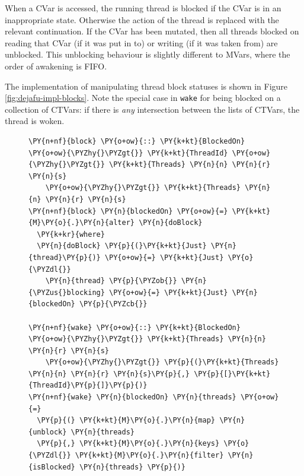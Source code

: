 When a CVar is accessed, the running thread is blocked if the CVar is
in an inappropriate state. Otherwise the action of the thread is
replaced with the relevant continuation. If the CVar has been mutated,
then all threads blocked on reading that CVar (if it was put in to) or
writing (if it was taken from) are unblocked. This unblocking
behaviour is slightly different to MVars, where the order of awakening
is FIFO.

The implementation of manipulating thread block statuses is shown in
Figure \ref{fig:dejafu-impl-blocks}. Note the special case in
\texttt{wake} for being blocked on a collection of CTVars: if there is
\textit{any} intersection between the lists of CTVars, the thread is
woken.

\begin{figure}[t]
  \centering



\begin{Verbatim}[commandchars=\\\{\}]
\PY{n+nf}{block} \PY{o+ow}{::} \PY{k+kt}{BlockedOn} \PY{o+ow}{\PYZhy{}\PYZgt{}} \PY{k+kt}{ThreadId} \PY{o+ow}{\PYZhy{}\PYZgt{}} \PY{k+kt}{Threads} \PY{n}{n} \PY{n}{r} \PY{n}{s}
    \PY{o+ow}{\PYZhy{}\PYZgt{}} \PY{k+kt}{Threads} \PY{n}{n} \PY{n}{r} \PY{n}{s}
\PY{n+nf}{block} \PY{n}{blockedOn} \PY{o+ow}{=} \PY{k+kt}{M}\PY{o}{.}\PY{n}{alter} \PY{n}{doBlock}
  \PY{k+kr}{where}
  \PY{n}{doBlock} \PY{p}{(}\PY{k+kt}{Just} \PY{n}{thread}\PY{p}{)} \PY{o+ow}{=} \PY{k+kt}{Just} \PY{o}{\PYZdl{}}
    \PY{n}{thread} \PY{p}{\PYZob{}} \PY{n}{\PYZus{}blocking} \PY{o+ow}{=} \PY{k+kt}{Just} \PY{n}{blockedOn} \PY{p}{\PYZcb{}}

\PY{n+nf}{wake} \PY{o+ow}{::} \PY{k+kt}{BlockedOn} \PY{o+ow}{\PYZhy{}\PYZgt{}} \PY{k+kt}{Threads} \PY{n}{n} \PY{n}{r} \PY{n}{s}
    \PY{o+ow}{\PYZhy{}\PYZgt{}} \PY{p}{(}\PY{k+kt}{Threads} \PY{n}{n} \PY{n}{r} \PY{n}{s}\PY{p}{,} \PY{p}{[}\PY{k+kt}{ThreadId}\PY{p}{]}\PY{p}{)}
\PY{n+nf}{wake} \PY{n}{blockedOn} \PY{n}{threads} \PY{o+ow}{=}
  \PY{p}{(} \PY{k+kt}{M}\PY{o}{.}\PY{n}{map} \PY{n}{unblock} \PY{n}{threads}
  \PY{p}{,} \PY{k+kt}{M}\PY{o}{.}\PY{n}{keys} \PY{o}{\PYZdl{}} \PY{k+kt}{M}\PY{o}{.}\PY{n}{filter} \PY{n}{isBlocked} \PY{n}{threads} \PY{p}{)}


\end{Verbatim}
\end{figure}
